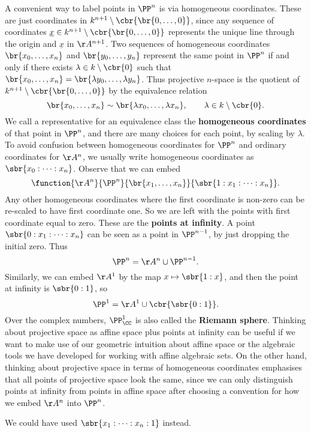 A convenient way to label points in $ \PP^n $ is via homogeneous coordinates. These are just coordinates in $ k^{n + 1} \setminus \cbr{\br{0, \dots, 0}} $, since any sequence of coordinates $ \underline{x} \in k^{n + 1} \setminus \cbr{\br{0, \dots, 0}} $ represents the unique line through the origin and $ \underline{x} $ in $ \AA^{n + 1} $. Two sequences of homogeneous coordinates $ \br{x_0, \dots, x_n} $ and $ \br{y_0, \dots, y_n} $ represent the same point in $ \PP^n $ if and only if there exists $ \lambda \in k \setminus \cbr{0} $ such that $ \br{x_0, \dots, x_n} = \br{\lambda y_0, \dots, \lambda y_n} $. Thus projective $ n $-space is the quotient of $ k^{n + 1} \setminus \cbr{\br{0, \dots, 0}} $ by the equivalence relation
$$ \br{x_0, \dots, x_n} \sim \br{\lambda x_0, \dots, \lambda x_n}, \qquad \lambda \in k \setminus \cbr{0}. $$
We call a representative for an equivalence class the \textbf{homogeneous coordinates} of that point in $ \PP^n $, and there are many choices for each point, by scaling by $ \lambda $. To avoid confusion between homogeneous coordinates for $ \PP^n $ and ordinary coordinates for $ \AA^n $, we usually write homogeneous coordinates as $ \sbr{x_0 : \dots : x_n} $. Observe that we can embed
$$ \function{\AA^n}{\PP^n}{\br{x_1, \dots, x_n}}{\sbr{1 : x_1 : \dots : x_n}}. $$
Any other homogeneous coordinates where the first coordinate is non-zero can be re-scaled to have first coordinate one. So we are left with the points with first coordinate equal to zero. These are the \textbf{points at infinity}. A point $ \sbr{0 : x_1 : \dots : x_n} $ can be seen as a point in $ \PP^{n - 1} $, by just dropping the initial zero. Thus
$$ \PP^n = \AA^n \cup \PP^{n - 1}. $$
Similarly, we can embed $ \AA^1 $ by the map $ x \mapsto \sbr{1 : x} $, and then the point at infinity is $ \sbr{0 : 1} $, so
$$ \PP^1 = \AA^1 \cup \cbr{\sbr{0 : 1}}. $$
Over the complex numbers, $ \PP_\CC^1 $ is also called the \textbf{Riemann sphere}. Thinking about projective space as affine space plus points at infinity can be useful if we want to make use of our geometric intuition about affine space or the algebraic tools we have developed for working with affine algebraic sets. On the other hand, thinking about projective space in terms of homogeneous coordinates emphasises that all points of projective space look the same, since we can only distinguish points at infinity from points in affine space after choosing a convention for how we embed $ \AA^n $ into $ \PP^n $.

\begin{example*}
We could have used $ \sbr{x_1 : \dots : x_n : 1} $ instead.
\end{example*}

